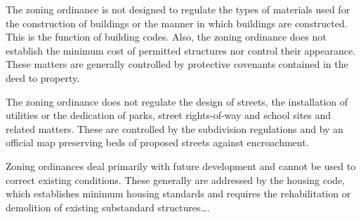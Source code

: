 
The zoning ordinance is not designed to regulate the types of materials used for
the construction of buildings or the manner in which buildings are constructed.
This is the function of building codes. Also, the zoning ordinance does not
establish the minimum cost of permitted structures nor control their appearance.
These matters are generally controlled by protective covenants contained in the
deed to property.

The zoning ordinance does not regulate the design of streets, the installation
of utilities or the dedication of parks, street rights-of-way and school sites
and related matters. These are controlled by the subdivision regulations and by
an official map preserving beds of proposed streets against encroachment.

Zoning ordinances deal primarily with future development and cannot be used to
correct existing conditions. These generally are addressed by the housing code,
which establishes minimum housing standards and requires the rehabilitation or
demolition of existing substandard structures\ldots .



